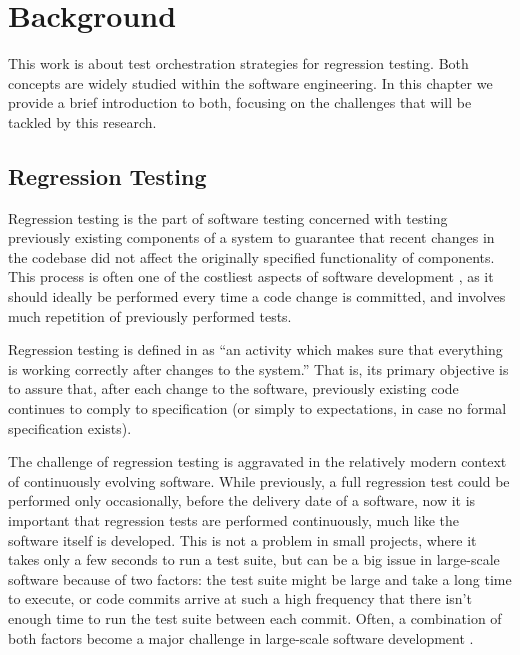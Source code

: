 \chapter{Background}\label{chap:background}

This work is about test orchestration strategies for regression testing.
Both concepts are widely studied within the software engineering.
In this chapter we provide a brief introduction to both, focusing on the challenges that will be tackled by this research.





\section{Regression Testing}\label{sec:regression}
Regression testing is the part of software testing concerned with testing previously existing components of a system to guarantee that recent changes in the codebase did not affect the originally specified functionality of components.
This process is often one of the costliest aspects of software development \cite{rothermel_improving_2018}, as it should ideally be performed every time a code change is committed, and involves much repetition of previously performed tests.

Regression testing is defined in \cite{minhas_regression_2017} as ``an activity which makes sure that everything is working correctly after changes to the system.''
That is, its primary objective is to assure that, after each change to the software, previously existing code continues to comply to specification (or simply to expectations, in case no formal specification exists).

The challenge of regression testing is aggravated in the relatively modern context of continuously evolving software.
While previously, a full regression test could be performed only occasionally, before the delivery date of a software, now it is important that regression tests are performed continuously, much like the software itself is developed.
This is not a problem in small projects, where it takes only a few seconds to run a test suite, but can be a big issue in large-scale software because of two factors: the test suite might be large and take a long time to execute, or code commits arrive at such a high frequency that there isn't enough time to run the test suite between each commit.
Often, a combination of both factors become a major challenge in large-scale software development \cite{memon_taming_2017}.

